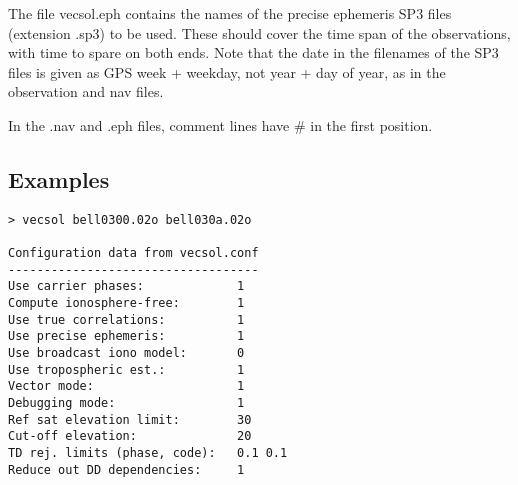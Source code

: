 The file vecsol.eph contains  the  names  of  the  precise ephemeris SP3 files (extension .sp3) to be used. These should cover the time span of the observations, with time to spare on both  ends. Note  that the date in the filenames of the SP3 files is given as GPS week + weekday, not year + day of year, as in the observation and nav files.

In the .nav and .eph files, comment lines have \# in the first position.
\subsection{Examples}
\begin{verbatim}
> vecsol bell0300.02o bell030a.02o

Configuration data from vecsol.conf
-----------------------------------
Use carrier phases:             1
Compute ionosphere-free:        1
Use true correlations:          1
Use precise ephemeris:          1
Use broadcast iono model:       0
Use tropospheric est.:          1
Vector mode:                    1
Debugging mode:                 1
Ref sat elevation limit:        30
Cut-off elevation:              20
TD rej. limits (phase, code):   0.1 0.1
Reduce out DD dependencies:     1


\end{verbatim}

